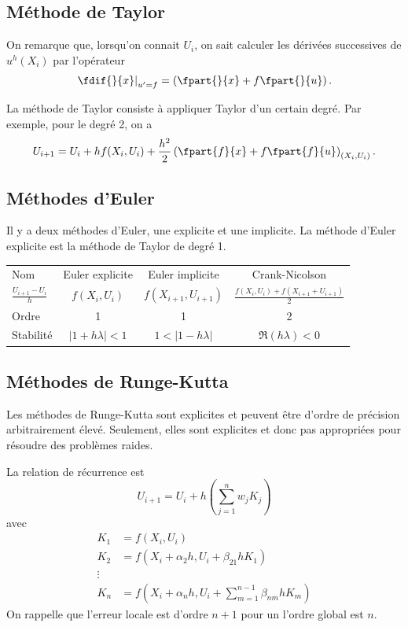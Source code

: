 \subsection{Méthode de Taylor}
On remarque que, lorsqu'on connait $U_i$, on sait calculer les dérivées
successives de $u^h(X_i)$ par l'opérateur
\[ \left.\fdif{}{x}\right|_{u'=f} = \left(\fpart{}{x} + f\fpart{}{u}\right). \]

La méthode de Taylor consiste à appliquer Taylor d'un certain degré.
Par exemple, pour le degré 2, on a
\[ U_{i+1} = U_i + h f(X_i, U_i) +
\frac{h^2}{2}\left(\fpart{f}{x}+f\fpart{f}{u}\right)_{(X_i,U_i)}. \]

\subsection{Méthodes d'Euler}
Il y a deux méthodes d'Euler, une explicite et une implicite.
La méthode d'Euler explicite est la méthode de Taylor de degré 1.
\begin{center}
  \begin{tabular}{|l|ccc|}
    \hline
    Nom & Euler explicite & Euler implicite & Crank-Nicolson\\
    $\frac{U_{i+1}-U_i}{h}$ & $f(X_i,U_i)$ & $f(X_{i+1},U_{i+1})$
    & $\frac{f(X_i,U_i)+f(X_{i+1}+U_{i+1})}{2}$\\
    Ordre & 1 & 1 & 2\\
    Stabilité & $|1 + h\lambda| < 1$ & $1 < |1 - h\lambda|$
    & $\Re(h\lambda) < 0$\\
    \hline
  \end{tabular}
\end{center}

\subsection{Méthodes de Runge-Kutta}
Les méthodes de Runge-Kutta sont explicites et peuvent être d'ordre de
précision arbitrairement élevé.
Seulement, elles sont explicites et donc pas appropriées pour
résoudre des problèmes raides.

La relation de récurrence est
\[ U_{i+1} = U_i + h\left(\sum_{j=1}^n w_jK_j\right) \]
avec
\begin{align*}
  K_1 & = f(X_i, U_i)\\
  K_2 & = f(X_i + \alpha_2 h, U_i + \beta_{21}hK_1)\\
  \vdots\\
  K_n & = f\left(X_i + \alpha_n h, U_i + \sum_{m=1}^{n-1}\beta_{nm}hK_m\right)
\end{align*}
On rappelle que l'erreur locale est d'ordre $n+1$
pour un l'ordre global est $n$.

